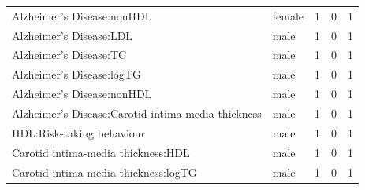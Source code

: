 \begin{table}[ht]
\begin{tabular}{llrrr}
  Alzheimer's Disease:nonHDL & female &   1 &   0 &   1 \\ 
  Alzheimer's Disease:LDL & male &   1 &   0 &   1 \\ 
  Alzheimer's Disease:TC & male &   1 &   0 &   1 \\ 
  Alzheimer's Disease:logTG & male &   1 &   0 &   1 \\ 
  Alzheimer's Disease:nonHDL & male &   1 &   0 &   1 \\ 
  Alzheimer's Disease:Carotid intima-media thickness & male &   1 &   0 &   1 \\ 
  HDL:Risk-taking behaviour & male &   1 &   0 &   1 \\ 
  Carotid intima-media thickness:HDL & male &   1 &   0 &   1 \\ 
  Carotid intima-media thickness:logTG & male &   1 &   0 &   1 \\ 
   \hline
\end{tabular}
\end{table}

